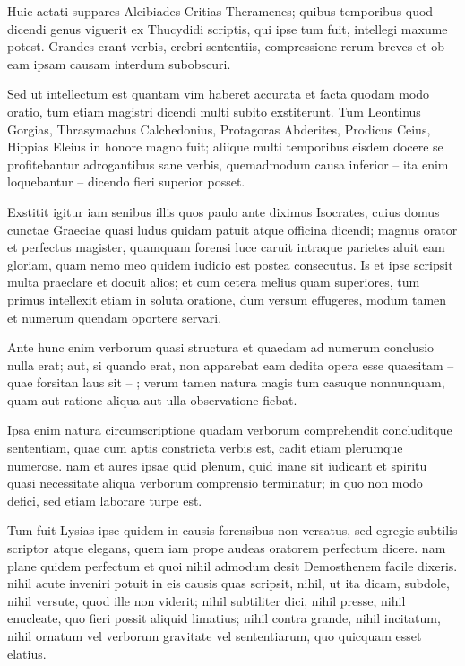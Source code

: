 Huic aetati suppares Alcibiades Critias Theramenes; quibus temporibus quod dicendi genus viguerit ex Thucydidi scriptis, qui ipse tum fuit, intellegi maxume potest. Grandes erant verbis, crebri sententiis, compressione rerum breves et ob eam ipsam causam interdum subobscuri.

Sed ut intellectum est quantam vim haberet accurata et facta quodam modo oratio, tum etiam magistri dicendi multi subito exstiterunt. Tum Leontinus Gorgias, Thrasymachus Calchedonius, Protagoras Abderites, Prodicus Ceius, Hippias Eleius in honore magno fuit; aliique multi temporibus eisdem docere se profitebantur adrogantibus sane verbis, quemadmodum causa inferior – ita enim loquebantur – dicendo fieri superior posset.

Exstitit igitur iam senibus illis quos paulo ante diximus Isocrates, cuius domus cunctae Graeciae quasi ludus quidam patuit atque officina dicendi; magnus orator et perfectus magister, quamquam forensi luce caruit intraque parietes aluit eam gloriam, quam nemo meo quidem iudicio est postea consecutus. Is et ipse scripsit multa praeclare et docuit alios; et cum cetera melius quam superiores, tum primus intellexit etiam in soluta oratione, dum versum effugeres, modum tamen et numerum quendam oportere servari.

Ante hunc enim verborum quasi structura et quaedam ad numerum conclusio nulla erat; aut, si quando erat, non apparebat eam dedita opera esse quaesitam – quae forsitan laus sit – ; verum tamen natura magis tum casuque nonnunquam, quam aut ratione aliqua aut ulla observatione fiebat.

Ipsa enim natura circumscriptione quadam verborum comprehendit concluditque sententiam, quae cum aptis constricta verbis est, cadit etiam plerumque numerose. nam et aures ipsae quid plenum, quid inane sit iudicant et spiritu quasi necessitate aliqua verborum comprensio terminatur; in quo non modo defici, sed etiam laborare turpe est.

Tum fuit Lysias ipse quidem in causis forensibus non versatus, sed egregie subtilis scriptor atque elegans, quem iam prope audeas oratorem perfectum dicere. nam plane quidem perfectum et quoi nihil admodum desit Demosthenem facile dixeris. nihil acute inveniri potuit in eis causis quas scripsit, nihil, ut ita dicam, subdole, nihil versute, quod ille non viderit; nihil subtiliter dici, nihil presse, nihil enucleate, quo fieri possit aliquid limatius; nihil contra grande, nihil incitatum, nihil ornatum vel verborum gravitate vel sententiarum, quo quicquam esset elatius.

